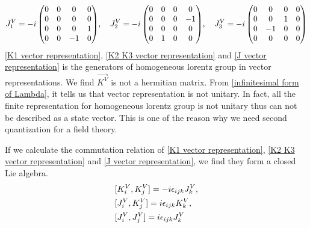    \begin{equation}\label{J vector representation}
   J_1^V = -i\,\mqty(0 & 0 & 0 & 0
                 \\0 & 0 & 0 & 0
                 \\0 & 0 & 0 & 1
                 \\0 & 0 &-1 & 0)
   ,\quad
   J_2^V = -i\,\mqty(0 & 0 & 0 & 0
                 \\0 & 0 & 0 &-1
                 \\0 & 0 & 0 & 0
                 \\0 & 1 & 0 & 0)
   ,\quad
   J_3^V = -i\,\mqty(0 & 0 & 0 & 0
                 \\0 & 0 & 1 & 0
                 \\0 &-1 & 0 & 0
                 \\0 & 0 & 0 & 0)               
   \end{equation}
   \eqref{K1 vector representation}, \eqref{K2 K3 vector representation} and \eqref{J vector representation} is the generators of homogeneous lorentz group in vector representations. We find $\vec{K^V}$ is not a hermitian matrix. From  \eqref{infinitesimal form of Lambda}, it tells us that vector representation is not unitary. In fact, all the finite representation for homogeneous lorentz group is not unitary thus can not be described as a state vector. This is one of the reason why we need second quantization for a field theory.
   
   If we calculate the commutation relation of \eqref{K1 vector representation}, \eqref{K2 K3 vector representation} and \eqref{J vector representation}, we find they form a closed Lie algebra.
   \begin{align}
   &[K_i^V,K_j^V] = -i \epsilon_{ijk} J_k^V,
   \label{commutation relation of homogeneous Lie algebra1}\\
   &[J_i^V,K_j^V] = i \epsilon_{ijk} K_k^V,
   \label{commutation relation of homogeneous Lie algebra2}\\
   &[J_i^V,J_j^V] = i \epsilon_{ijk} J_k^V
   \label{commutation relation of homogeneous Lie algebra3}
   \end{align}
   
